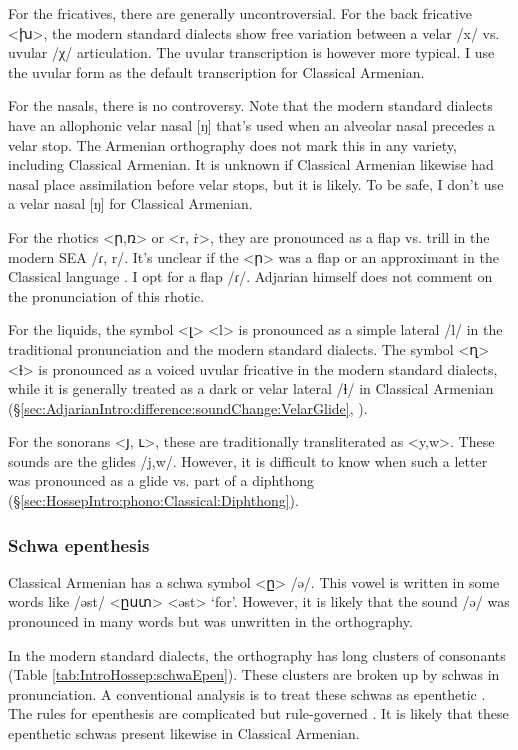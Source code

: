 For the fricatives, there are generally uncontroversial. 		 For the back fricative <խ>, the modern standard dialects show free variation between a velar /x/ vs. uvular /χ/ articulation. The uvular transcription is however more typical. I use the uvular form as the default transcription for Classical Armenian. 

For the nasals, there is no controversy. Note that the modern standard dialects have an allophonic velar nasal [ŋ] that's used when an alveolar nasal precedes a velar stop. The Armenian orthography does not mark this in any variety, including Classical Armenian. It is unknown if Classical Armenian likewise had nasal place assimilation before velar stops, but it is likely. To be safe, I don't use a velar nasal [ŋ] for Classical Armenian. 

For the rhotics    <ր,ռ> or <r, ṙ>, they are    pronounced as a flap vs. trill in the modern SEA /ɾ, r/. It's unclear if the <ր> was a flap or an approximant in the Classical language \citep[1040]{Macak-2017-PhonoClassicalArmenian}. I opt for a flap /ɾ/. Adjarian himself does not comment on the pronunciation of this rhotic. 


For the liquids, the symbol <լ> <l> is pronounced as a simple lateral /l/ in the traditional pronunciation and the modern standard dialects. The symbol <ղ> <ɬ> is pronounced as a voiced uvular fricative in the modern standard dialects, while it is generally treated as a dark or velar lateral /ɬ/ in   Classical Armenian (\S\ref{sec:AdjarianIntro:difference:soundChange:VelarGlide}, \citealt[ch2]{Macak-2016-StudiesClassicalModernArmenianPhono}).

For the sonorans <յ, ւ>, these are traditionally transliterated as <y,w>. These sounds are the glides /j,w/. However, it is difficult to know when such a letter was pronounced as a glide vs. part of a diphthong (\S\ref{sec:HossepIntro:phono:Classical:Diphthong}). 

\subsubsection{Schwa epenthesis}


Classical Armenian has a schwa symbol <ը> /ə/. This vowel is written in some words  like /əst/ <ըստ> <əst> `for'. However, it is likely that the sound /ə/ was pronounced in many words but was unwritten in the orthography. 

In the modern standard dialects, the orthography has long clusters of consonants (Table \ref{tab:IntroHossep:schwaEpen}). These clusters are broken up by schwas in pronunciation. A conventional analysis is to treat these schwas as epenthetic \citep{Vaux-1998-ArmenianPhono}. The rules for epenthesis are complicated but rule-governed \citep[cf.]{Dolatian-prep-Schwa}. It is likely that these epenthetic schwas present likewise in Classical Armenian. 



